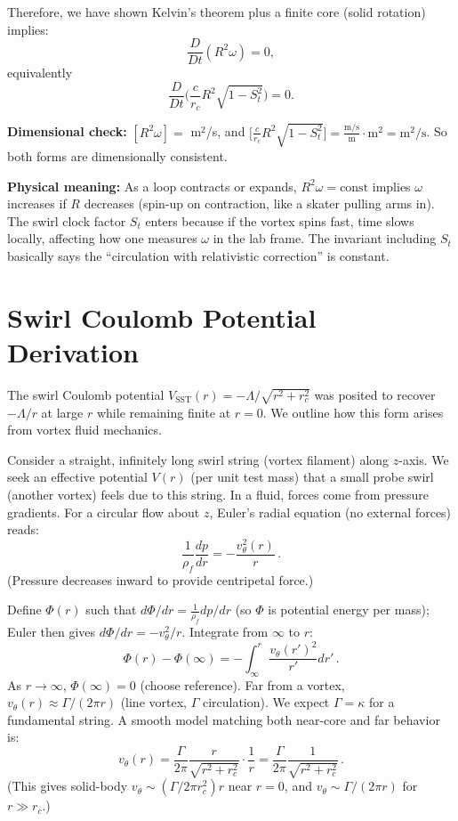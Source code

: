 \documentclass[reprint,aps,onecolumn,nofootinbib]{revtex4-2}
\begin{document}
	Therefore, we have shown Kelvin’s theorem plus a finite core (solid rotation) implies:
	\[
		\frac{D}{Dt}(R^2 \omega) = 0,
	\]
	equivalently
	\[
		\frac{D}{Dt}\Big(\frac{c}{r_c}R^2\sqrt{1 - S_t^2}\Big) = 0.
	\]

	\noindent\textbf{Dimensional check:} $[R^2 \omega] =$ m$^2$/s, and
	$\big[\frac{c}{r_c}R^2\sqrt{1 - S_t^2}\big] = \frac{\text{m/s}}{\text{m}} \cdot \text{m}^2 = \text{m}^2/\text{s}$. So both forms are dimensionally consistent.

	\noindent\textbf{Physical meaning:} As a loop contracts or expands, $R^2 \omega = \text{const}$ implies $\omega$ increases if $R$ decreases (spin-up on contraction, like a skater pulling arms in). The swirl clock factor $S_t$ enters because if the vortex spins fast, time slows locally, affecting how one measures $\omega$ in the lab frame. The invariant including $S_t$ basically says the “circulation with relativistic correction” is constant.

	\section{Swirl Coulomb Potential Derivation}
	The swirl Coulomb potential $V_{\text{SST}}(r) = -\Lambda/\sqrt{r^2+r_c^2}$ was posited to recover $- \Lambda/r$ at large $r$ while remaining finite at $r=0$. We outline how this form arises from vortex fluid mechanics.

	Consider a straight, infinitely long swirl string (vortex filament) along $z$-axis. We seek an effective potential $V(r)$ (per unit test mass) that a small probe swirl (another vortex) feels due to this string. In a fluid, forces come from pressure gradients. For a circular flow about $z$, Euler’s radial equation (no external forces) reads:
	\[
		\frac{1}{\rho_f}\frac{dp}{dr} = -\frac{v_{\theta}^2(r)}{r}\,.
	\]
	(Pressure decreases inward to provide centripetal force.)

	Define $\Phi(r)$ such that $d\Phi/dr = \frac{1}{\rho_f}dp/dr$ (so $\Phi$ is potential energy per mass); Euler then gives $d\Phi/dr = -v_{\theta}^2/r$. Integrate from $\infty$ to $r$:
	\[
		\Phi(r) - \Phi(\infty) = -\int_{\infty}^{r} \frac{v_{\theta}(r')^2}{r'} dr'\,.
	\]
	As $r\to\infty$, $\Phi(\infty)=0$ (choose reference). Far from a vortex, $v_{\theta}(r) \approx \Gamma/(2\pi r)$ (line vortex, $\Gamma$ circulation). We expect $\Gamma = \kappa$ for a fundamental string. A smooth model matching both near-core and far behavior is:
	\[
		v_{\theta}(r) = \frac{\Gamma}{2\pi}\frac{r}{\sqrt{r^2+r_c^2}}\cdot\frac{1}{r} = \frac{\Gamma}{2\pi}\frac{1}{\sqrt{r^2+r_c^2}}\,.
	\]
	(This gives solid-body $v_{\theta}\sim (\Gamma/2\pi r_c^2)r$ near $r=0$, and $v_{\theta}\sim \Gamma/(2\pi r)$ for $r\gg r_c$.)
\end{document}

